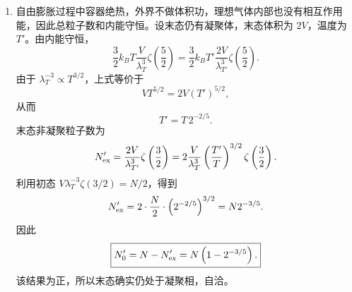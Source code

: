 \begin{question}[25 分]
\begin{solution}
\begin{enumerate}
    \item 自由膨胀过程中容器绝热，外界不做体积功，理想气体内部也没有相互作用能，因此总粒子数和内能守恒。设末态仍有凝聚体，末态体积为 $2V$，温度为 $T'$。由内能守恒，
    \[
        \frac{3}{2}k_BT\frac{V}{\lambda_T^3}\zeta\left(\frac{5}{2}\right)
        =\frac{3}{2}k_BT'\frac{2V}{\lambda_{T'}^3}\zeta\left(\frac{5}{2}\right).
    \]
    由于 $\lambda_T^{-3}\propto T^{3/2}$，上式等价于
    \[
        VT^{5/2}=2V(T')^{5/2},
    \]
    从而
    \[
        T'=T\,2^{-2/5}.
    \]
    末态非凝聚粒子数为
    \[
        N'_{\rm ex}=\frac{2V}{\lambda_{T'}^3}\zeta\left(\frac{3}{2}\right)
        =2\frac{V}{\lambda_T^3}\left(\frac{T'}{T}\right)^{3/2}\zeta\left(\frac{3}{2}\right).
    \]
    利用初态 $V\lambda_T^{-3}\zeta(3/2)=N/2$，得到
    \[
        N'_{\rm ex}=2\cdot\frac{N}{2}\cdot\left(2^{-2/5}\right)^{3/2}
        =N2^{-3/5}.
    \]
    因此
    \[
        \boxed{N_0'=N-N'_{\rm ex}=N\left(1-2^{-3/5}\right).}
    \]
    该结果为正，所以末态确实仍处于凝聚相，自洽。
\end{enumerate}
\end{solution}
\end{question}

